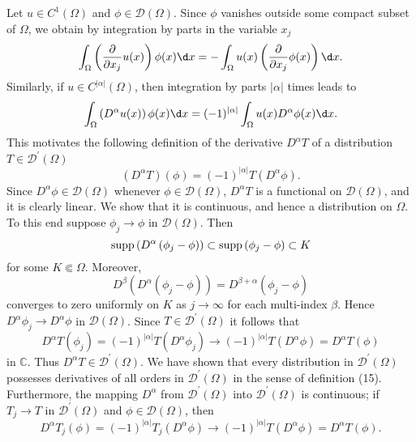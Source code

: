 \begin{para}
  Let $u \in C^1(\Omega)$ and $\phi \in \mathscr{D}(\Omega)$. Since $\phi$ vanishes outside some compact subset of $\Omega$, we obtain by integration by parts in the variable $x_j$
  \[
  \int_{\Omega}\left(\frac{\partial}{\partial x_j} u(x)\right) \phi(x) \d x
    = -\int_{\Omega} u(x)\left(\frac{\partial}{\partial x_j} \phi(x)\right) \d x.
  \]
  Similarly, if $u \in C^{|\alpha|}(\Omega)$, then integration by parts $|\alpha|$ times leads to
  \[
  \int_{\Omega}\left(D^\alpha u(x)\right) \phi(x) \d x
    =(-1)^{|\alpha|} \int_{\Omega} u(x) D^\alpha \phi(x) \d x.
  \]
  This motivates the following definition of the derivative $D^\alpha T$
  of a distribution $T \in \mathscr{D}^{\prime}(\Omega)$
  \[
  \left(D^\alpha T\right)(\phi)=(-1)^{|\alpha|} T\left(D^\alpha \phi\right) .
  \]
  Since $D^\alpha \phi \in \mathscr{D}(\Omega)$ whenever $\phi \in \mathscr{D}(\Omega)$,
  $D^\alpha T$ is a functional on $\mathscr{D}(\Omega)$, and it is clearly linear.
  We show that it is continuous, and hence a distribution on $\Omega$.
  To this end suppose $\phi_j \rightarrow \phi$ in $\mathscr{D}(\Omega)$. Then
  \[
    \operatorname{supp}\left(D^\alpha\left(\phi_j-\phi\right)\right) \subset \operatorname{supp}\left(\phi_j-\phi\right) \subset K
  \]
  for some $K \Subset \Omega$. Moreover,
  \[
  D^\beta\left(D^\alpha\left(\phi_j-\phi\right)\right)=D^{\beta+\alpha}\left(\phi_j-\phi\right)
  \]
  converges to zero uniformly on $K$ as $j \rightarrow \infty$ for each multi-index $\beta$.
  Hence $D^\alpha \phi_j \rightarrow D^\alpha \phi$ in $\mathscr{D}(\Omega)$.
  Since $T \in \mathscr{D}^{\prime}(\Omega)$ it follows that
  \[
  D^\alpha T\left(\phi_j\right)=(-1)^{|\alpha|} T\left(D^\alpha \phi_j\right) \rightarrow(-1)^{|\alpha|} T\left(D^\alpha \phi\right)=D^\alpha T(\phi)
  \]
  in $\mathbb{C}$. Thus $D^\alpha T \in \mathscr{D}^{\prime}(\Omega)$.
  We have shown that every distribution in $\mathscr{D}^{\prime}(\Omega)$ possesses derivatives
  of all orders in $\mathscr{D}^{\prime}(\Omega)$ in the sense of definition (15).
  Furthermore, the mapping $D^\alpha$ from $\mathscr{D}^{\prime}(\Omega)$
  into $\mathscr{D}^{\prime}(\Omega)$ is continuous;
  if $T_j \rightarrow T$ in $\mathscr{D}^{\prime}(\Omega)$ and $\phi \in \mathscr{D}(\Omega)$,
  then
  \[
  D^\alpha T_j(\phi)=(-1)^{|\alpha|} T_j\left(D^\alpha \phi\right) \rightarrow(-1)^{|\alpha|} T\left(D^\alpha \phi\right)=D^\alpha T(\phi) .
  \]
\end{para}

